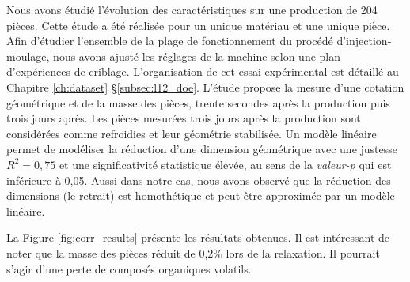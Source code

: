 Nous avons étudié l'évolution des caractéristiques sur une production de 204 pièces.
Cette étude a été réalisée pour un unique matériau et une unique pièce.
Afin d'étudier l'ensemble de la plage de fonctionnement du procédé d'injection-moulage, nous avons ajusté les réglages de la machine selon une plan d'expériences de criblage.
L'organisation de cet essai expérimental est détaillé au Chapitre \ref{ch:dataset} §\ref{subsec:l12_doe}.
L'étude propose la mesure d'une cotation géométrique et de la masse des pièces, trente secondes après la production puis trois jours après.
Les pièces mesurées trois jours après la production sont considérées comme refroidies et leur géométrie stabilisée.
Un modèle linéaire permet de modéliser la réduction d'une dimension géométrique avec une justesse $R^2 = 0,75$ et une significativité statistique élevée, au sens de la \textit{valeur-p} qui est inférieure à 0,05.
Aussi dans notre cas, nous avons observé que la réduction des dimensions (le retrait) est homothétique et peut être approximée par un modèle linéaire.

La Figure \ref{fig;corr_results} présente les résultats obtenues.
Il est intéressant de noter que la masse des pièces réduit de 0,2\% lors de la relaxation.
Il pourrait s'agir d'une perte de composés organiques volatils.

